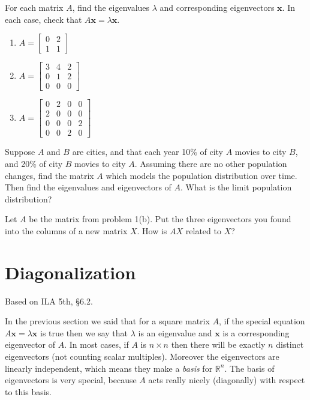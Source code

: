 \documentclass[11pt,oneside]{amsbook}
\newcommand{\R}{\mathbb R}
\theoremstyle{definition}
\theoremstyle{plain}
\theoremstyle{definition}
\theoremstyle{remark}
\numberwithin{equation}{section}
\numberwithin{figure}{section}
\newcounter{activityitem}
\newenvironment{activity}{\begin{list}{\arabic{activityitem}.}{\usecounter{activityitem}\setlength{\itemsep}{.2in}}}{\end{list}}
\begin{document}
\begin{activity}
  \item For each matrix $A$, find the eigenvalues $\lambda$ and corresponding eigenvectors $\mathbf{x}$. In each case, check that $A\mathbf{x}=\lambda\mathbf{x}$.
  \begin{enumerate}
    \item $A=\begin{bmatrix}0&2\\1&1\end{bmatrix}$
    \item $A=\begin{bmatrix}
      3 & 4 & 2 \\
      0 & 1 & 2 \\
      0 & 0 & 0
      \end{bmatrix}$
    \item $A=\begin{bmatrix}
      0 & 2 & 0 & 0 \\
      2 & 0 & 0 & 0 \\
      0 & 0 & 0 & 2 \\
      0 & 0 & 2 & 0
    \end{bmatrix}$
  \end{enumerate}
  \item Suppose $A$ and $B$ are cities, and that each year 10\% of city $A$ movies to city $B$, and 20\% of city $B$ movies to city $A$. Assuming there are no other population changes, find the matrix $A$ which models the population distribution over time. Then find the eigenvalues and eigenvectors of $A$. What is the limit population distribution?
  \item Let $A$ be the matrix from problem 1(b). Put the three eigenvectors you found into the columns of a new matrix $X$. How is $AX$ related to $X$?
\end{activity}


\newpage
\section{Diagonalization}

Based on ILA 5th, \S 6.2.

In the previous section we said that for a square matrix $A$, if the special equation $A\mathbf{x}=\lambda\mathbf{x}$ is true then we say that $\lambda$ is an eigenvalue and $\mathbf{x}$ is a corresponding eigenvector of $A$. In most cases, if $A$ is $n\times n$ then there will be exactly $n$ distinct eigenvectors (not counting scalar multiples). Moreover the eigenvectors are linearly independent, which means they make a \emph{basis} for $\R^n$. The basis of eigenvectors is very special, because $A$ acts really nicely (diagonally) with respect to this basis.
\end{document}
